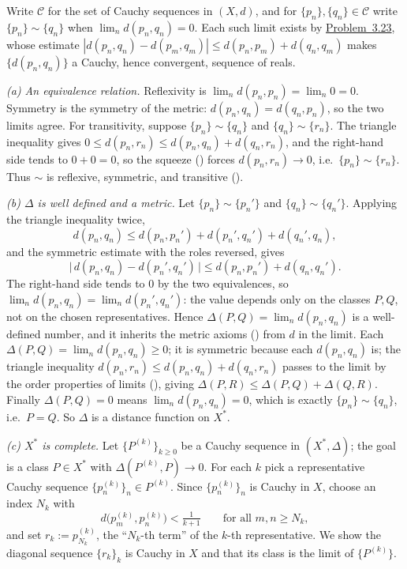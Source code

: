 \documentclass[main.tex]{subfiles}
\begin{document}
\begin{SolutionBlue}
Write $\mathcal C$ for the set of Cauchy sequences in $(X,d)$, and for $\{p_n\},\{q_n\}\in\mathcal C$
write $\{p_n\}\sim\{q_n\}$ when $\lim_n d(p_n,q_n)=0$. Each such limit exists by
\hyperlink{prob:3.23}{Problem~3.23}, whose estimate
$|d(p_n,q_n)-d(p_m,q_m)|\le d(p_n,p_m)+d(q_n,q_m)$ makes $\{d(p_n,q_n)\}$ a Cauchy, hence convergent,
sequence of reals.

\emph{(a) An equivalence relation.} Reflexivity is $\lim_n d(p_n,p_n)=\lim_n 0=0$. Symmetry is the
symmetry of the metric: $d(p_n,q_n)=d(q_n,p_n)$, so the two limits agree. For transitivity, suppose
$\{p_n\}\sim\{q_n\}$ and $\{q_n\}\sim\{r_n\}$. The triangle inequality gives
$0\le d(p_n,r_n)\le d(p_n,q_n)+d(q_n,r_n)$, and the right-hand side tends to $0+0=0$, so the squeeze
() forces $d(p_n,r_n)\to 0$, i.e.\ $\{p_n\}\sim\{r_n\}$. Thus $\sim$ is reflexive,
symmetric, and transitive ().

\emph{(b) $\Delta$ is well defined and a metric.} Let $\{p_n\}\sim\{p_n'\}$ and $\{q_n\}\sim\{q_n'\}$.
Applying the triangle inequality twice,
\[
d(p_n,q_n)\le d(p_n,p_n')+d(p_n',q_n')+d(q_n',q_n),
\]
and the symmetric estimate with the roles reversed, gives
\[
\bigl|\,d(p_n,q_n)-d(p_n',q_n')\,\bigr|\le d(p_n,p_n')+d(q_n,q_n').
\]
The right-hand side tends to $0$ by the two equivalences, so $\lim_n d(p_n,q_n)=\lim_n d(p_n',q_n')$:
the value depends only on the classes $P,Q$, not on the chosen representatives. Hence
$\Delta(P,Q)=\lim_n d(p_n,q_n)$ is a well-defined number, and it inherits the metric axioms
() from $d$ in the limit. Each $\Delta(P,Q)=\lim_n d(p_n,q_n)\ge 0$; it is symmetric
because each $d(p_n,q_n)$ is; the triangle inequality $d(p_n,r_n)\le d(p_n,q_n)+d(q_n,r_n)$ passes to
the limit by the order properties of limits (), giving
$\Delta(P,R)\le\Delta(P,Q)+\Delta(Q,R)$. Finally $\Delta(P,Q)=0$ means $\lim_n d(p_n,q_n)=0$, which is
exactly $\{p_n\}\sim\{q_n\}$, i.e.\ $P=Q$. So $\Delta$ is a distance function on $X^*$.

\emph{(c) $X^*$ is complete.} Let $\{P^{(k)}\}_{k\ge 0}$ be a Cauchy sequence in $(X^*,\Delta)$; the
goal is a class $P\in X^*$ with $\Delta(P^{(k)},P)\to 0$. For each $k$ pick a representative Cauchy
sequence $\{p^{(k)}_n\}_n\in P^{(k)}$. Since $\{p^{(k)}_n\}_n$ is Cauchy in $X$, choose an index $N_k$
with
\[
d\bigl(p^{(k)}_m,p^{(k)}_n\bigr)<\tfrac{1}{k+1}\qquad\text{for all }m,n\ge N_k,
\]
and set $r_k:=p^{(k)}_{N_k}$, the ``$N_k$-th term'' of the $k$-th representative. We show the diagonal
sequence $\{r_k\}_k$ is Cauchy in $X$ and that its class is the limit of $\{P^{(k)}\}$.


\end{SolutionBlue}
\end{document}
